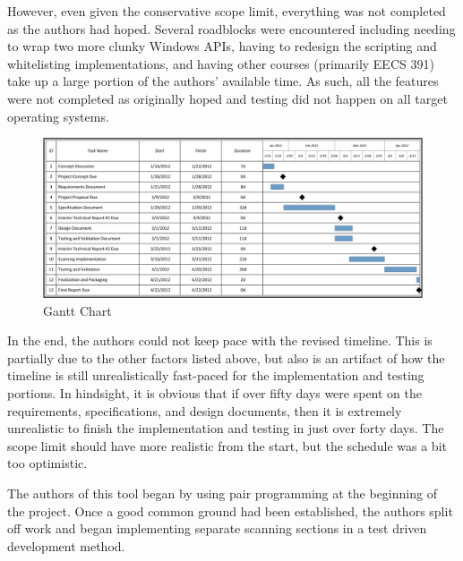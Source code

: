 \documentclass[letterpaper,12pt]{article}
\begin{document}
However, even given the conservative scope limit, everything was not completed
as the authors had hoped.  Several roadblocks were encountered including needing
to wrap two more clunky Windows APIs, having to redesign the scripting and
whitelisting implementations, and having other courses (primarily EECS 391) take
up a large portion of the authors' available time.  As such, all the features
were not completed as originally hoped and testing did not happen on all target
operating systems.  

\begin{figure}[h]
  	\centering
	\includegraphics[scale=.7]{figures/GanttChart.png}
  	\caption{Gantt Chart}
  	\label{gantt}
\end{figure}

In the end, the authors could not keep pace with the revised timeline.  This is
partially due to the other factors listed above, but also is an artifact of how
the timeline is still unrealistically fast-paced for the implementation and
testing portions.  In hindsight, it is obvious that if over fifty days were
spent on the requirements, specifications, and design documents, then it is
extremely unrealistic to finish the implementation and testing in just over
forty days.  The scope limit should have more realistic from the start, but the
schedule was a bit too optimistic.  

The authors of this tool began by using pair programming at the beginning of the
project.  Once a good common ground had been established, the authors split off
work and began implementing separate scanning sections in a test driven
development method.  

\newpage
\end{document}

